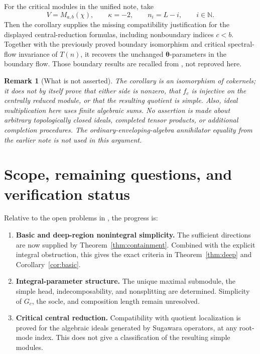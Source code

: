 \documentclass[11pt,a4paper]{article}
\newcommand{\N}{\mathbb N}
\theoremstyle{plainupright}
\newtheorem{remark}[theorem]{Remark}
\begin{document}
For the critical modules in the unified note, take
\[
V=M_{a,b}(\chi),\qquad \kappa=-2,\qquad
n_i=L-i,\qquad i\in\N.
\]
Then the corollary supplies the missing compatibility justification
for the displayed central-reduction formulas, including nonboundary
indices \(c<b\).
Together with the previously proved boundary isomorphism and critical
spectral-flow invariance of \(T(n)\), it recovers the unchanged
\(\boldsymbol\theta\)-parameters in the boundary flow.
Those boundary results are recalled from \cite{Unified}, not reproved
here.

\begin{remark}[What is not asserted]
The corollary is an isomorphism of cokernels; it does not by itself
prove that either side is nonzero, that \(f_c\) is injective on the
centrally reduced module, or that the resulting quotient is simple.
Also, ideal multiplication here uses finite algebraic sums.
No assertion is made about arbitrary topologically closed ideals,
completed tensor products, or additional completion procedures.
The ordinary-enveloping-algebra annihilator equality from the earlier
note is not used in this argument.
\end{remark}

\section{Scope, remaining questions, and verification status}

Relative to the open problems in \cite{Unified}, the progress is:
\begin{enumerate}[leftmargin=*,label=\arabic*.]
\item \textbf{Basic and deep-region nonintegral simplicity.}
The sufficient directions are now supplied by
Theorem~\ref{thm:containment}. Combined with the explicit integral
obstruction, this gives the exact criteria in
Theorem~\ref{thm:deep} and Corollary~\ref{cor:basic}.
\item \textbf{Integral-parameter structure.}
The unique maximal submodule, the simple head, indecomposability,
and nonsplitting are determined. Simplicity of \(G_c\), the socle,
and composition length remain unresolved.
\item \textbf{Critical central reduction.}
Compatibility with quotient localization is proved for the algebraic
ideals generated by Sugawara operators, at any root-mode index.
This does not give a classification of the resulting simple modules.
\end{enumerate}
\end{document}

